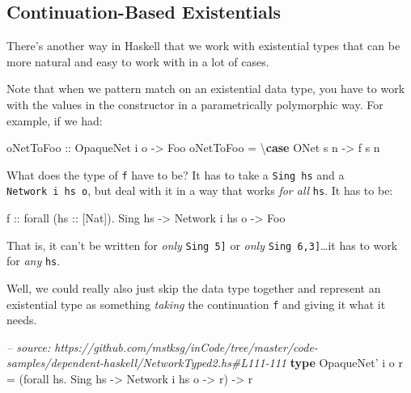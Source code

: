 \documentclass[]{article}
\newenvironment{Shaded}{}{}
\newcommand{\KeywordTok}[1]{\textcolor[rgb]{0.00,0.44,0.13}{\textbf{{#1}}}}
\newcommand{\DataTypeTok}[1]{\textcolor[rgb]{0.56,0.13,0.00}{{#1}}}
\newcommand{\CommentTok}[1]{\textcolor[rgb]{0.38,0.63,0.69}{\textit{{#1}}}}
\newcommand{\OtherTok}[1]{\textcolor[rgb]{0.00,0.44,0.13}{{#1}}}
\newcommand{\FunctionTok}[1]{\textcolor[rgb]{0.02,0.16,0.49}{{#1}}}
\newcommand{\NormalTok}[1]{{#1}}
\begin{document}
\subsection{Continuation-Based
Existentials}\label{continuation-based-existentials}

There's another way in Haskell that we work with existential types that can be
more natural and easy to work with in a lot of cases.

Note that when we pattern match on an existential data type, you have to work
with the values in the constructor in a parametrically polymorphic way. For
example, if we had:

\begin{Shaded}
\begin{Highlighting}[]
\OtherTok{oNetToFoo ::} \DataTypeTok{OpaqueNet} \NormalTok{i o }\OtherTok{->} \DataTypeTok{Foo}
\NormalTok{oNetToFoo }\FunctionTok{=} \NormalTok{\textbackslash{}}\KeywordTok{case} \DataTypeTok{ONet} \NormalTok{s n }\OtherTok{->} \NormalTok{f s n}
\end{Highlighting}
\end{Shaded}

What does the type of \texttt{f} have to be? It has to take a \texttt{Sing\ hs}
and a \texttt{Network\ i\ hs\ o}, but deal with it in a way that works \emph{for
all} \texttt{hs}. It has to be:

\begin{Shaded}
\begin{Highlighting}[]
\OtherTok{f ::} \NormalTok{forall (}\OtherTok{hs ::} \NormalTok{[}\DataTypeTok{Nat}\NormalTok{])}\FunctionTok{.} \DataTypeTok{Sing} \NormalTok{hs }\OtherTok{->} \DataTypeTok{Network} \NormalTok{i hs o }\OtherTok{->} \DataTypeTok{Foo}
\end{Highlighting}
\end{Shaded}

That is, it can't be written for \emph{only}
\texttt{Sing\ \textquotesingle{}{[}5{]}} or \emph{only}
\texttt{Sing\ \textquotesingle{}{[}6,3{]}}\ldots{}it has to work for \emph{any}
\texttt{hs}.

Well, we could really also just skip the data type together and represent an
existential type as something \emph{taking} the continuation \texttt{f} and
giving it what it needs.

\begin{Shaded}
\begin{Highlighting}[]
\CommentTok{-- source: https://github.com/mstksg/inCode/tree/master/code-samples/dependent-haskell/NetworkTyped2.hs#L111-111}
\KeywordTok{type} \DataTypeTok{OpaqueNet'} \NormalTok{i o r }\FunctionTok{=} \NormalTok{(forall hs}\FunctionTok{.} \DataTypeTok{Sing} \NormalTok{hs }\OtherTok{->} \DataTypeTok{Network} \NormalTok{i hs o }\OtherTok{->} \NormalTok{r) }\OtherTok{->} \NormalTok{r}
\end{Highlighting}
\end{Shaded}
\end{document}
